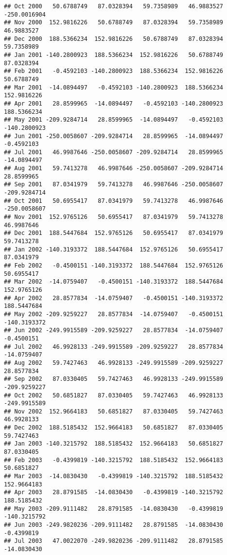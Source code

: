 \documentclass[]{article}
\begin{document}
\begin{verbatim}
## Oct 2000   50.6788749   87.0328394   59.7358989   46.9883527 -250.0016904
## Nov 2000  152.9816226   50.6788749   87.0328394   59.7358989   46.9883527
## Dec 2000  188.5366234  152.9816226   50.6788749   87.0328394   59.7358989
## Jan 2001 -140.2800923  188.5366234  152.9816226   50.6788749   87.0328394
## Feb 2001   -0.4592103 -140.2800923  188.5366234  152.9816226   50.6788749
## Mar 2001  -14.0894497   -0.4592103 -140.2800923  188.5366234  152.9816226
## Apr 2001   28.8599965  -14.0894497   -0.4592103 -140.2800923  188.5366234
## May 2001 -209.9284714   28.8599965  -14.0894497   -0.4592103 -140.2800923
## Jun 2001 -250.0058607 -209.9284714   28.8599965  -14.0894497   -0.4592103
## Jul 2001   46.9987646 -250.0058607 -209.9284714   28.8599965  -14.0894497
## Aug 2001   59.7413278   46.9987646 -250.0058607 -209.9284714   28.8599965
## Sep 2001   87.0341979   59.7413278   46.9987646 -250.0058607 -209.9284714
## Oct 2001   50.6955417   87.0341979   59.7413278   46.9987646 -250.0058607
## Nov 2001  152.9765126   50.6955417   87.0341979   59.7413278   46.9987646
## Dec 2001  188.5447684  152.9765126   50.6955417   87.0341979   59.7413278
## Jan 2002 -140.3193372  188.5447684  152.9765126   50.6955417   87.0341979
## Feb 2002   -0.4500151 -140.3193372  188.5447684  152.9765126   50.6955417
## Mar 2002  -14.0759407   -0.4500151 -140.3193372  188.5447684  152.9765126
## Apr 2002   28.8577834  -14.0759407   -0.4500151 -140.3193372  188.5447684
## May 2002 -209.9259227   28.8577834  -14.0759407   -0.4500151 -140.3193372
## Jun 2002 -249.9915589 -209.9259227   28.8577834  -14.0759407   -0.4500151
## Jul 2002   46.9928133 -249.9915589 -209.9259227   28.8577834  -14.0759407
## Aug 2002   59.7427463   46.9928133 -249.9915589 -209.9259227   28.8577834
## Sep 2002   87.0330405   59.7427463   46.9928133 -249.9915589 -209.9259227
## Oct 2002   50.6851827   87.0330405   59.7427463   46.9928133 -249.9915589
## Nov 2002  152.9664183   50.6851827   87.0330405   59.7427463   46.9928133
## Dec 2002  188.5185432  152.9664183   50.6851827   87.0330405   59.7427463
## Jan 2003 -140.3215792  188.5185432  152.9664183   50.6851827   87.0330405
## Feb 2003   -0.4399819 -140.3215792  188.5185432  152.9664183   50.6851827
## Mar 2003  -14.0830430   -0.4399819 -140.3215792  188.5185432  152.9664183
## Apr 2003   28.8791585  -14.0830430   -0.4399819 -140.3215792  188.5185432
## May 2003 -209.9111482   28.8791585  -14.0830430   -0.4399819 -140.3215792
## Jun 2003 -249.9820236 -209.9111482   28.8791585  -14.0830430   -0.4399819
## Jul 2003   47.0022070 -249.9820236 -209.9111482   28.8791585  -14.0830430

\end{verbatim}
\end{document}
